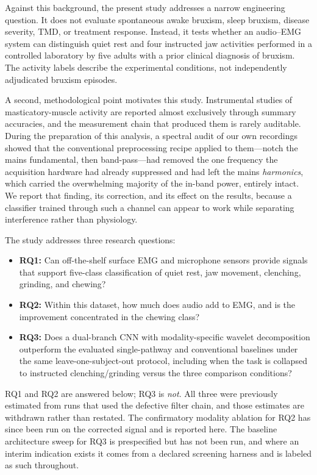 \documentclass[pdflatex,sn-nature,iicol]{sn-jnl}
\begin{document}
Against this background, the present study addresses a narrow engineering question. It does not evaluate spontaneous awake bruxism, sleep bruxism, disease severity, TMD, or treatment response. Instead, it tests whether an audio--EMG system can distinguish quiet rest and four instructed jaw activities performed in a controlled laboratory by five adults with a prior clinical diagnosis of bruxism. The activity labels describe the experimental conditions, not independently adjudicated bruxism episodes.

A second, methodological point motivates this study. Instrumental studies of masticatory-muscle activity are reported almost exclusively through summary accuracies, and the measurement chain that produced them is rarely auditable. During the preparation of this analysis, a spectral audit of our own recordings showed that the conventional preprocessing recipe applied to them---notch the mains fundamental, then band-pass---had removed the one frequency the acquisition hardware had already suppressed and had left the mains \emph{harmonics}, which carried the overwhelming majority of the in-band power, entirely intact. We report that finding, its correction, and its effect on the results, because a classifier trained through such a channel can appear to work while separating interference rather than physiology.

The study addresses three research questions:

\begin{itemize}
    \item \textbf{RQ1:} Can off-the-shelf surface EMG and microphone sensors provide signals that support five-class classification of quiet rest, jaw movement, clenching, grinding, and chewing?
    \item \textbf{RQ2:} Within this dataset, how much does audio add to EMG, and is the improvement concentrated in the chewing class?
    \item \textbf{RQ3:} Does a dual-branch CNN with modality-specific wavelet decomposition outperform the evaluated single-pathway and conventional baselines under the same leave-one-subject-out protocol, including when the task is collapsed to instructed clenching/grinding versus the three comparison conditions?
\end{itemize}

RQ1 and RQ2 are answered below; RQ3 is \emph{not}. All three were previously estimated from runs that used the defective filter chain, and those estimates are withdrawn rather than restated. The confirmatory modality ablation for RQ2 has since been run on the corrected signal and is reported here. The baseline architecture sweep for RQ3 is prespecified but has not been run, and where an interim indication exists it comes from a declared screening harness and is labeled as such throughout.
\end{document}
